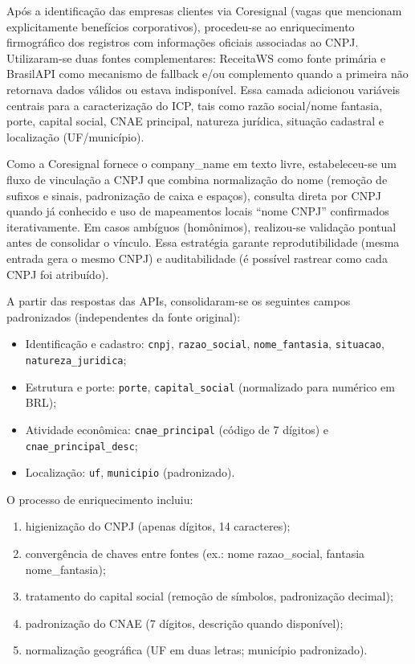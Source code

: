 Após a identificação das empresas clientes via Coresignal (vagas que mencionam explicitamente benefícios corporativos), procedeu-se ao enriquecimento firmográfico dos registros com informações oficiais associadas ao CNPJ. Utilizaram-se duas fontes complementares: ReceitaWS como fonte primária e BrasilAPI como mecanismo de fallback e/ou complemento quando a primeira não retornava dados válidos ou estava indisponível. Essa camada adicionou variáveis centrais para a caracterização do ICP, tais como razão social/nome fantasia, porte, capital social, CNAE principal, natureza jurídica, situação cadastral e localização (UF/município).

Como a Coresignal fornece o company\_name em texto livre, estabeleceu-se um fluxo de vinculação a CNPJ que combina normalização do nome (remoção de sufixos e sinais, padronização de caixa e espaços), consulta direta por CNPJ quando já conhecido e uso de mapeamentos locais “nome  CNPJ” confirmados iterativamente. Em casos ambíguos (homônimos), realizou-se validação pontual antes de consolidar o vínculo. Essa estratégia garante reprodutibilidade (mesma entrada gera o mesmo CNPJ) e auditabilidade (é possível rastrear como cada CNPJ foi atribuído).

A partir das respostas das APIs, consolidaram-se os seguintes campos padronizados (independentes da fonte original):

\begin{itemize}
    \item Identificação e cadastro: \texttt{cnpj}, \texttt{razao\_social}, \texttt{nome\_fantasia}, \texttt{situacao}, \texttt{natureza\_juridica};
    \item Estrutura e porte: \texttt{porte}, \texttt{capital\_social} (normalizado para numérico em BRL);
    \item Atividade econômica: \texttt{cnae\_principal} (código de 7 dígitos) e \texttt{cnae\_principal\_desc};
    \item Localização: \texttt{uf}, \texttt{municipio} (padronizado).
\end{itemize}

O processo de enriquecimento incluiu:
\begin{enumerate}
    \item higienização do CNPJ (apenas dígitos, 14 caracteres);
    \item convergência de chaves entre fontes (ex.: nome  razao\_social, fantasia  nome\_fantasia);
    \item tratamento do capital social (remoção de símbolos, padronização decimal);
    \item padronização do CNAE (7 dígitos, descrição quando disponível);
    \item normalização geográfica (UF em duas letras; município padronizado).
\end{enumerate}

